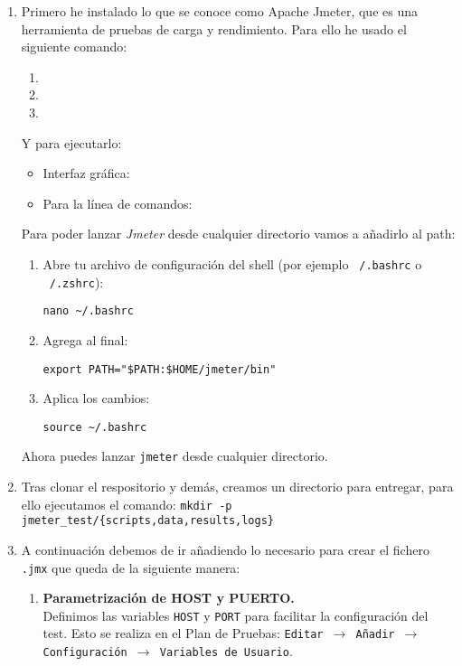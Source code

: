 \begin{enumerate}
    \item Primero he instalado lo que se conoce como Apache Jmeter, que es una herramienta de pruebas de carga y rendimiento. Para ello he usado el siguiente comando:
    \begin{enumerate}
        \item {}
        \item {}
        \item {}
    \end{enumerate}
    Y para ejecutarlo:
    \begin{itemize}
        \item Interfaz gráfica: 
        \item Para la línea de comandos: 
    \end{itemize}
    Para poder lanzar \textit{Jmeter} desde cualquier directorio vamos a añadirlo al path:
    \begin{enumerate}
        \item Abre tu archivo de configuración del shell (por ejemplo \texttt{~/.bashrc} o \texttt{~/.zshrc}):
        \begin{lstlisting}[style=customstyle]
    nano ~/.bashrc
        \end{lstlisting}
        \item Agrega al final:
        \begin{lstlisting}[style=customstyle]
    export PATH="$PATH:$HOME/jmeter/bin"
        \end{lstlisting}
        \item Aplica los cambios:
        \begin{lstlisting}[style=customstyle]
    source ~/.bashrc
        \end{lstlisting}
    \end{enumerate}

    Ahora puedes lanzar \texttt{jmeter} desde cualquier directorio.

    \item Tras clonar el respositorio y demás, creamos un directorio para entregar, para ello ejecutamos el comando: \texttt{mkdir -p jmeter\_test/\{scripts,data,results,logs\}}  
    \item A continuación debemos de ir añadiendo lo necesario para crear el fichero \texttt{.jmx} que queda de la siguiente manera:
    \begin{enumerate}
            \item \textbf{Parametrización de HOST y PUERTO.} \\
            Definimos las variables \texttt{HOST} y \texttt{PORT} para facilitar la configuración del test. Esto se realiza en el Plan de Pruebas: \texttt{Editar $\rightarrow$ Añadir $\rightarrow$ Configuración $\rightarrow$ Variables de Usuario}.


\end{enumerate}
\end{enumerate}
